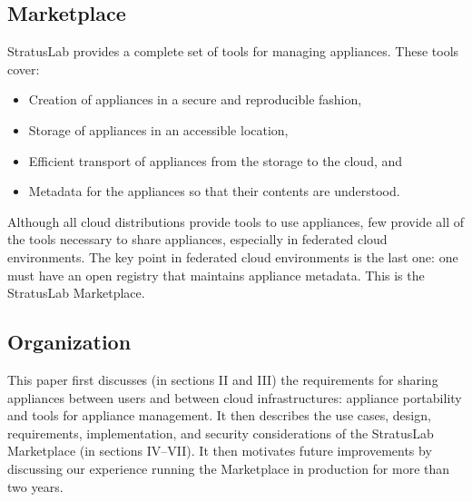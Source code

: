\subsection{Marketplace}

StratusLab provides a complete set of tools for managing appliances.
These tools cover:
\begin{itemize}
\item Creation of appliances in a secure and reproducible fashion,
\item Storage of appliances in an accessible location,
\item Efficient transport of appliances from the storage to the cloud,
  and
\item Metadata for the appliances so that their contents are
  understood. 
\end{itemize}
Although all cloud distributions provide tools to use appliances, few
provide all of the tools necessary to share appliances, especially in
federated cloud environments.  The key point in federated cloud
environments is the last one: one must have an open registry
that maintains appliance metadata.  This is the StratusLab
Marketplace\@. 

\subsection{Organization}

This paper first discusses (in sections II and III) the requirements
for sharing appliances between users and between cloud
infrastructures: appliance portability and tools for appliance
management.  It then describes the use cases, design, requirements,
implementation, and security considerations of the StratusLab
Marketplace (in sections IV--VII).  It then motivates future
improvements by discussing our experience running the Marketplace in
production for more than two years.

